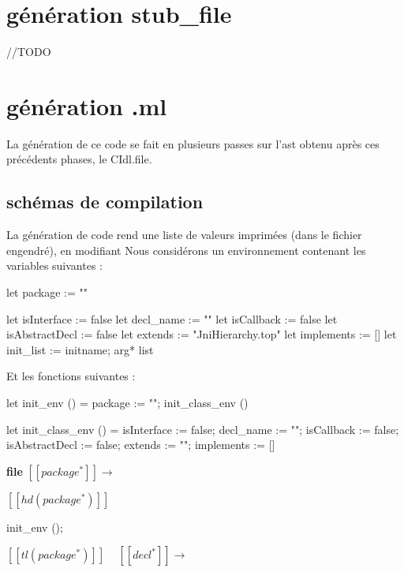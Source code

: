 \documentclass[a4paper, 11pt]{report}
\begin{document}
\section{génération stub\_file}
//TODO











\section{génération .ml}

La génération de ce code se fait en plusieurs passes sur l'ast obtenu
après ces précédents phases, le CIdl.file.

\subsection{schémas de compilation}
La génération de code rend une liste de valeurs imprimées (dans le
fichier engendré), en modifiant
Nous considérons un environnement contenant les  variables suivantes : 
\begin{OCaml}
let package := ""

let isInterface := false
let decl_name := ""
let isCallback := false
let isAbstractDecl := false
let extends := "JniHierarchy.top"
let implements := []
let init_list := {initname; arg*} list

\end{OCaml}
Et les fonctions suivantes :
\begin{OCaml}
let init_env () =
  package := "";
  init_class_env ()

let init_class_env () =
  isInterface := false;
  decl_name := "";
  isCallback := false;
  isAbstractDecl := false;
  extends := "";
  implements := []
\end{OCaml}
\textbf{file}
\newline
\noindent
$[\![ package^* ]\!]$$\longrightarrow$

$[\![ hd(package^*) ]\!]$
\begin{OCaml}
   init_env ();
\end{OCaml} 

$[\![ tl(package^*) ]\!]$ 
\newline
\ 
\newline
\noindent
$[\![ decl^* ]\!]$$\longrightarrow$
\end{document}
